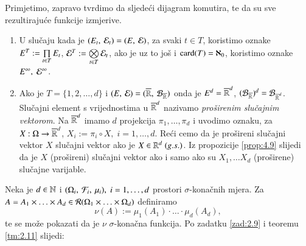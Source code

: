 Primjetimo, zapravo tvrdimo da sljede\' ci dijagram komutira, te da su sve rezultiraju\' ce funkcije izmjerive.
\begin{figure}[H]
    \centering
\end{figure}

\begin{nap} \label{nap:4.10}
    \begin{enumerate}[label=(\alph*)]
        \item U slu\v caju kada je $(E_t, \: \mathcal{E}_t) = (E, \: \mathcal{E})$, za svaki $t \in T$, koristimo oznake $E^T := \prod\limits_{t \in T}^{} E_t$, $\mathcal{E}^T := \bigotimes\limits_{t \in T}^{} \mathcal{E}_t$, ako je uz to jo\v s i $\mathrm{card}({T}) = \aleph_0$, koristimo oznake $E^\infty, \; \mathcal{E}^\infty$.
        \item Ako je $T = \{1, 2, \dots,  d\}$ i $(E, \: \mathcal{E}) = ({\overline{\mathbb{R}}}, \: {\mathcal{B}_{\overline{\mathbb{R}}}})$ onda je $E^d = \overline{\mathbb{R}}^d$, $(\mathcal{B}_{\overline{\mathbb{R}}})^d = \mathcal{B}_{\overline{\mathbb{R}}^d}$.
        Slu\v cajni element s vrijednostima u $\overline{\mathbb{R}}^d$ nazivamo \emph{pro\v sirenim slu\v cajnim vektorom}.
        Na $\overline{\mathbb{R}}^d$ imamo $d$ projekcija $\pi_1, \dots, \pi_d$ i uvodimo oznaku, za $X : \Omega \to \overline{\mathbb{R}}^d$, $X_i := \pi_i \circ X, \; i = 1, \dots, d$.
        Re\' ci cemo da je pro\v sireni slu\v cajni vektor $X$ slu\v cajni vektor ako je $X \in \mathbb{R}^d \; (g.s.)$.
        Iz propozicije \ref{prop:4.9} slijedi da je $X$ (pro\v sireni) slu\v cajni vektor ako i samo ako su $X_1, \dots X_d$ (pro\v sirene) slu\v cajne varijable.
    \end{enumerate}
\end{nap}

Neka je $d \in \mathbb{N}$ i $(\Omega_i, \: \mathcal{F}_i, \: \mu_i), \; i = 1, \dots, d$ prostori $\sigma$-kona\v cnih mjera.
Za $A = A_1 \times \ldots \times A_d \in \mathcal{R}({\Omega_1 \times \ldots \times \Omega_d})$ definiramo
\begin{equation}    \label{jed:4.11}
    \nu (A) := \mu_1 (A_1) \cdot \ldots \cdot \mu_d (A_d),
\end{equation}
te se mo\v ze pokazati da je $\nu$ $\sigma$-kona\v cna funkcija.
Po zadatku \ref{zad:2.9} i teoremu \ref{tm:2.11} slijedi:

